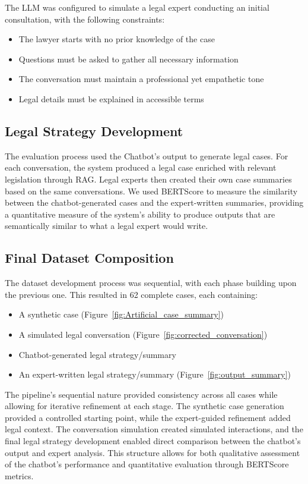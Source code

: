 The LLM was configured to simulate a legal expert conducting an initial consultation, with the following constraints:
\begin{itemize}
    \item The lawyer starts with no prior knowledge of the case
    \item Questions must be asked to gather all necessary information
    \item The conversation must maintain a professional yet empathetic tone
    \item Legal details must be explained in accessible terms
\end{itemize}

\subsection{Legal Strategy Development}
The evaluation process used the Chatbot's output to generate legal cases. For each conversation, the system produced a legal case 
enriched with relevant legislation through RAG. Legal experts then created their own case summaries based on the same conversations. 
We used BERTScore to measure the similarity between the chatbot-generated cases and the expert-written summaries, 
providing a quantitative measure of the system's ability to produce outputs that are semantically similar to what a legal expert would write.

\subsection{Final Dataset Composition}
The dataset development process was sequential, with each phase building upon the previous one. This resulted in 62 complete cases, each containing:
\begin{itemize}
    \item A synthetic case (Figure~\ref{fig:Artificial_case_summary})
    \item A simulated legal conversation (Figure~\ref{fig:corrected_conversation})
    \item Chatbot-generated legal strategy/summary
    \item An expert-written legal strategy/summary (Figure~\ref{fig:output_summary})
\end{itemize}

The pipeline's sequential nature provided consistency across all cases while allowing for iterative refinement at each stage. 
The synthetic case generation provided a controlled starting point, while the expert-guided refinement added legal context. 
The conversation simulation created simulated interactions, and the final legal strategy development enabled direct comparison 
between the chatbot's output and expert analysis. This structure allows for both qualitative assessment of the chatbot's performance 
and quantitative evaluation through BERTScore metrics.

